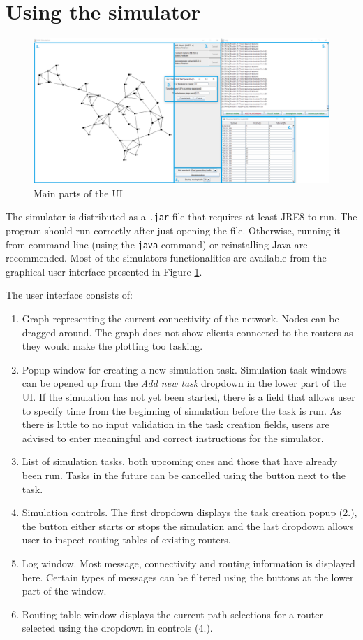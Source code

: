 \documentclass[11pt,a4paper,titlepage]{report}
\begin{document}
\section{Using the simulator}
\begin{figure}
\includegraphics[width=\textwidth]{ui_screenshot}
\caption{Main parts of the UI}
\label{fig:ui}
\end{figure}
The simulator is distributed as a \texttt{.jar} file that requires at least JRE8 to run. The program should run correctly after just opening the file. Otherwise, running it from command line (using the \texttt{java} command) or reinstalling Java are recommended. Most of the simulators functionalities are available from the graphical user interface presented in Figure \ref{fig:ui}.

The user interface consists of:
\begin{enumerate}
\item Graph representing the current connectivity of the network. Nodes can be dragged around. The graph does not show clients connected to the routers as they would make the plotting too tasking.
\item Popup window for creating a new simulation task. Simulation task windows can be opened up from the \emph{Add new task} dropdown in the lower part of the UI. If the simulation has not yet been started, there is a field that allows user to specify time from the beginning of simulation before the task is run. As there is little to no input validation in the task creation fields, users are advised to enter meaningful and correct instructions for the simulator.
\item List of simulation tasks, both upcoming ones and those that have already been run. Tasks in the future can be cancelled using the button next to the task.
\item Simulation controls. The first dropdown displays the task creation popup (2.), the button either starts or stops the simulation and the last dropdown allows user to inspect routing tables of existing routers.
\item Log window. Most message, connectivity and routing information is displayed here. Certain types of messages can be filtered using the buttons at the lower part of the window.
\item Routing table window displays the current path selections for a router selected using the dropdown in controls (4.).
\end{enumerate}
\end{document}
